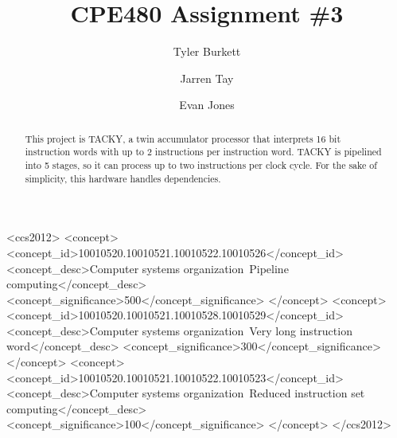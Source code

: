 \documentclass[sigconf]{acmart}
\begin{document}
%
\title{CPE480 Assignment \#3 }

%
\author{Tyler Burkett}

\author{Jarren Tay}

\author{Evan Jones}
%
\renewcommand{\shortauthors}{Burkett, Jones, Tay}

%
\begin{abstract}
This project is TACKY, a twin accumulator processor that interprets 16 bit instruction words with up to 2 instructions per instruction word. TACKY is pipelined into 5 stages, so it can process up to two instructions per clock cycle. For the sake of simplicity, this hardware handles dependencies.
\end{abstract}

%
%
  \begin{CCSXML}
<ccs2012>
<concept>
<concept_id>10010520.10010521.10010522.10010526</concept_id>
<concept_desc>Computer systems organization~Pipeline computing</concept_desc>
<concept_significance>500</concept_significance>
</concept>
<concept>
<concept_id>10010520.10010521.10010528.10010529</concept_id>
<concept_desc>Computer systems organization~Very long instruction word</concept_desc>
<concept_significance>300</concept_significance>
</concept>
<concept>
<concept_id>10010520.10010521.10010522.10010523</concept_id>
<concept_desc>Computer systems organization~Reduced instruction set computing</concept_desc>
<concept_significance>100</concept_significance>
</concept>
</ccs2012>
\end{CCSXML}
\end{document}
